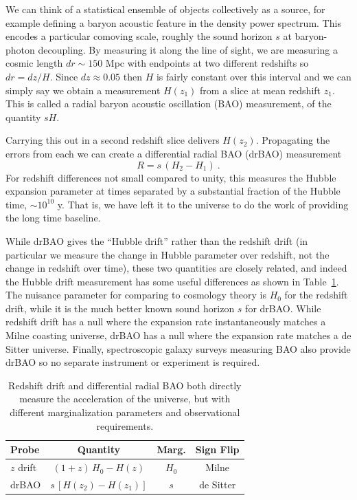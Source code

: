 \documentclass[preprint2, 10pt]{aastex}
\newcommand{\be}{\begin{equation}}
\newcommand{\ee}{\end{equation}}
\begin{document}
We can think of a statistical ensemble of objects collectively as 
a source, for example 
defining a baryon acoustic feature in the density power spectrum.  This 
encodes a particular comoving scale, roughly the sound horizon $s$ at 
baryon-photon decoupling.  By measuring it along the line of sight, we 
are measuring a cosmic length $dr\sim150$ Mpc with endpoints at two 
different redshifts so $dr=dz/H$.  Since $dz\approx0.05$ then $H$ is 
fairly constant over this interval and we can simply say we obtain a 
measurement $H(z_1)$ from a slice at mean redshift $z_1$.  This is called a 
radial baryon acoustic oscillation (BAO) measurement, of the quantity 
$sH$. 

Carrying this out in a second redshift slice delivers $H(z_2)$.  Propagating 
the errors from each we can create a differential radial BAO (drBAO) 
measurement 
\be 
R=s\,(H_2-H_1) \ . \label{eq:drbao} 
\ee 
For redshift differences not small compared to unity, this measures the 
Hubble expansion parameter at times separated by a substantial fraction 
of the Hubble time, $\sim10^{10}$ y.  That is, we have left it to the universe 
to do the work of providing the long time baseline.  

While drBAO gives the ``Hubble drift'' rather than the redshift drift 
(in particular we measure the change in Hubble parameter over redshift, 
not the change in redshift over time), these two quantities are 
closely related, and indeed the Hubble drift measurement has some 
useful differences as shown in Table~\ref{tab:drbao}.  The nuisance 
parameter for comparing to cosmology theory is $H_0$ for the redshift 
drift, while it is the much better known sound horizon $s$ for drBAO.  
While redshift drift has a null where the expansion rate instantaneously 
matches a Milne coasting universe, 
drBAO has a null where the expansion rate matches a 
de Sitter universe. Finally, 
spectroscopic galaxy surveys measuring BAO also provide drBAO so no 
separate instrument or experiment is required. 


\begin{table}[!htb]
\small 
\begin{tabular}{l|ccc} 
Probe  &  Quantity  & Marg. & Sign Flip\\ 
\hline 
$z$ drift &$(1+z)\,H_0-H(z)$ & $H_0$ & Milne \\ 
drBAO & $s\,[H(z_2)-H(z_1)]$ & $s$ & de Sitter \\ 
\end{tabular} 
\caption{Redshift drift and differential radial BAO both 
directly measure the acceleration of the universe, but with different 
marginalization parameters and observational requirements. 
} 
\label{tab:drbao} 
\end{table} 
\end{document}
